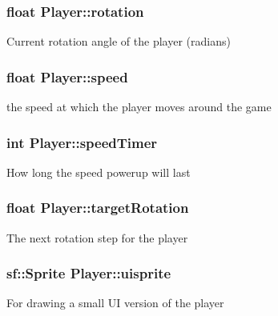 \subsubsection[{\texorpdfstring{rotation}{rotation}}]{\setlength{\rightskip}{0pt plus 5cm}float Player\+::rotation\hspace{0.3cm}{\ttfamily [private]}}\hypertarget{class_player_ad94d3e5ab67795f8f848a7fd565f376f}{}\label{class_player_ad94d3e5ab67795f8f848a7fd565f376f}
Current rotation angle of the player (radians) 
\subsubsection[{\texorpdfstring{speed}{speed}}]{\setlength{\rightskip}{0pt plus 5cm}float Player\+::speed\hspace{0.3cm}{\ttfamily [private]}}\hypertarget{class_player_a770942101eff683b030edde9f730d537}{}\label{class_player_a770942101eff683b030edde9f730d537}
the speed at which the player moves around the game 
\subsubsection[{\texorpdfstring{speed\+Timer}{speedTimer}}]{\setlength{\rightskip}{0pt plus 5cm}int Player\+::speed\+Timer\hspace{0.3cm}{\ttfamily [private]}}\hypertarget{class_player_a76c58869bfd24e6439b9aa4e27474d82}{}\label{class_player_a76c58869bfd24e6439b9aa4e27474d82}
How long the speed powerup will last 
\subsubsection[{\texorpdfstring{target\+Rotation}{targetRotation}}]{\setlength{\rightskip}{0pt plus 5cm}float Player\+::target\+Rotation\hspace{0.3cm}{\ttfamily [private]}}\hypertarget{class_player_a6185b0bd1fac283fb37a3f29e36d29f5}{}\label{class_player_a6185b0bd1fac283fb37a3f29e36d29f5}
The next rotation step for the player 
\subsubsection[{\texorpdfstring{uisprite}{uisprite}}]{\setlength{\rightskip}{0pt plus 5cm}sf\+::\+Sprite Player\+::uisprite\hspace{0.3cm}{\ttfamily [private]}}\hypertarget{class_player_a77d9d9c028b74c1d83744762f655352d}{}\label{class_player_a77d9d9c028b74c1d83744762f655352d}
For drawing a small UI version of the player 
